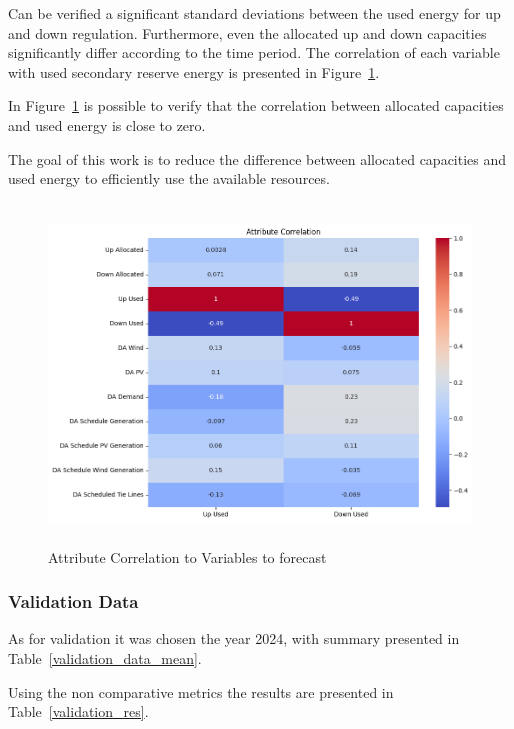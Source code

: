 

Can be verified a significant standard deviations between the used energy for up and down regulation. Furthermore, even the allocated up and down capacities significantly differ according to the time period. 
%
The correlation of each variable with used secondary reserve energy is presented in Figure~\ref{fig:Attribute_correlation}.

In Figure~\ref{fig:Attribute_correlation} is possible to verify that the correlation between allocated capacities and used energy is close to zero.  
  
The goal of this work is to reduce the difference between allocated capacities and used energy to efficiently use the available resources.

\begin{figure}[H]
    \centering
    \includegraphics[height=9cm, keepaspectratio=true]{plots/correlation_heatmap.png}
    \caption{Attribute Correlation to Variables to forecast}
    \label{fig:Attribute_correlation}
  \end{figure}
  


\subsubsection{Validation Data}
As for validation it was chosen the year 2024, with summary presented in Table~\ref{validation_data_mean}.\par

Using the non comparative metrics the results are presented in Table~\ref{validation_res}.

